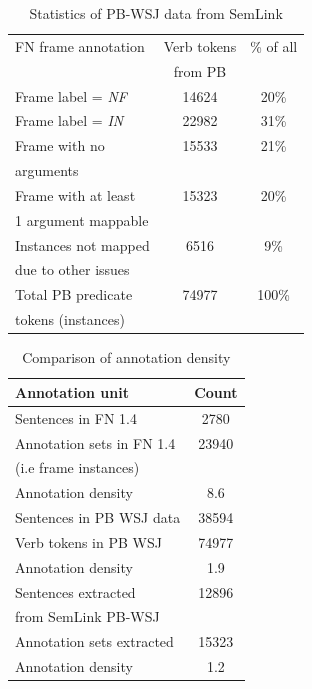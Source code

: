 \documentclass[11pt]{article}
\begin{document}
\begin{table}
\caption{Statistics of PB-WSJ data from SemLink}
\label{tab:wsjstats}
\begin{tabular}{|l|c|c|} \hline
FN frame annotation & Verb tokens & \% of all \\
& from PB & \\ \hline \hline
Frame label = \textit{NF} & 14624 & 20\%\\ \hline
Frame label = \textit{IN} & 22982 & 31\% \\ \hline
Frame with no & 15533 & 21\% \\ 
arguments  & & \\\hline
Frame with at least & 15323 & 20\% \\ 
1 argument mappable & & \\ \hline
Instances not mapped & 6516 & 9\% \\ 
due to other issues & & \\ \hline \hline
Total PB predicate & 74977 & 100\% \\
tokens (instances) & & \\ \hline
\end{tabular}
\end{table}

\begin{table}
\caption{Comparison of annotation density}
\begin{tabular}{|l|c|} \hline
\label{tab:annoUnit}
Annotation unit & Count \\\hline \hline
Sentences in FN 1.4 & 2780 \\ 
Annotation sets in FN 1.4 & 23940 \\ %
(i.e frame instances) & \\ 
Annotation density & 8.6 \\ \hline \hline
Sentences in PB WSJ data &  38594 \\ 
Verb tokens in PB WSJ & 74977 \\ 
Annotation density &  1.9 \\\hline \hline
Sentences extracted & 12896 \\ 
from SemLink PB-WSJ & \\ 
Annotation sets extracted & 15323\\ 
Annotation density & 1.2 \\ \hline 
\end{tabular}
\end{table}
\end{document}
